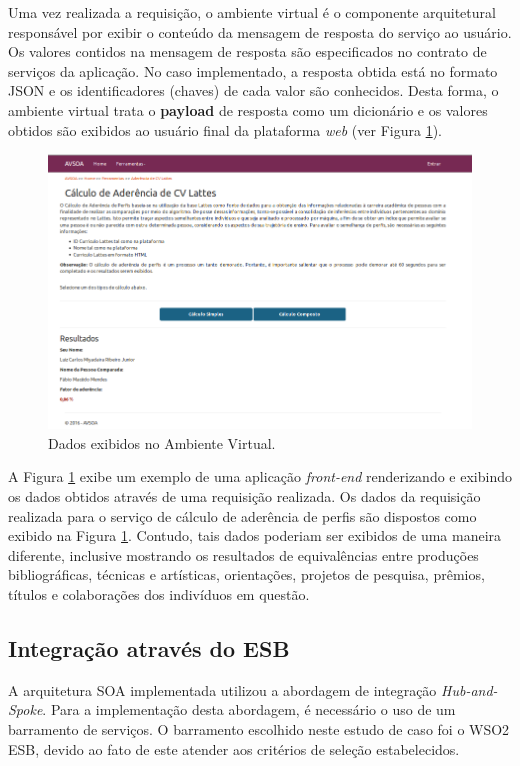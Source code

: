 Uma vez realizada a requisição, o ambiente virtual é o componente arquitetural responsável por exibir o conteúdo da mensagem de resposta do serviço ao usuário. Os valores contidos na mensagem de resposta são especificados no contrato de serviços da aplicação. No caso implementado, a resposta obtida está no formato JSON e os identificadores (chaves) de cada valor são conhecidos. Desta forma, o ambiente virtual trata o \textbf{payload} de resposta como um dicionário e os valores obtidos são exibidos ao usuário final da plataforma \textit{web} (ver Figura \ref{print_ambiente_virtual}).

\begin{figure}[!hbt]
\centering
\includegraphics[scale=0.7]{figuras/print_avsoa.png}
\caption{Dados exibidos no Ambiente Virtual.}
\label{print_ambiente_virtual}
\end{figure}

A Figura \ref{print_ambiente_virtual} exibe um exemplo de uma aplicação \textit{front-end} renderizando e exibindo os dados obtidos através de uma requisição realizada. Os dados da requisição realizada para o serviço de cálculo de aderência de perfis são dispostos como exibido na Figura \ref{print_ambiente_virtual}. Contudo, tais dados poderiam ser exibidos de uma maneira diferente, inclusive mostrando os resultados de equivalências entre produções bibliográficas, técnicas e artísticas, orientações, projetos de pesquisa, prêmios, títulos e colaborações dos indivíduos em questão.

\subsection{Integração através do ESB}
A arquitetura SOA implementada utilizou a abordagem de integração \textit{Hub-and-Spoke}. Para a implementação desta abordagem, é necessário o uso de um barramento de serviços. O barramento escolhido neste estudo de caso foi o WSO2 ESB, devido ao fato de este atender aos critérios de seleção estabelecidos. 

